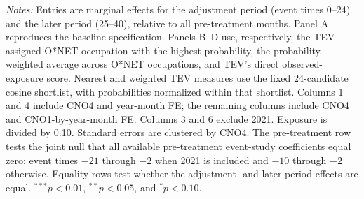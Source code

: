 \begin{table}[H]
\begin{threeparttable}
\begin{minipage}{0.92\textwidth}
\emph{Notes:} Entries are marginal effects for the adjustment period (event times 0--24) and the later period (25--40), relative to all pre-treatment months. Panel A reproduces the baseline specification. Panels B--D use, respectively, the TEV-assigned O*NET occupation with the highest probability, the probability-weighted average across O*NET occupations, and TEV's direct observed-exposure score. Nearest and weighted TEV measures use the fixed 24-candidate cosine shortlist, with probabilities normalized within that shortlist. Columns 1 and 4 include CNO4 and year-month FE; the remaining columns include CNO4 and CNO1-by-year-month FE. Columns 3 and 6 exclude 2021. Exposure is divided by 0.10. Standard errors are clustered by CNO4. The pre-treatment row tests the joint null that all available pre-treatment event-study coefficients equal zero: event times $-21$ through $-2$ when 2021 is included and $-10$ through $-2$ otherwise. Equality rows test whether the adjustment- and later-period effects are equal. $^{***}p<0.01$, $^{**}p<0.05$, and $^{*}p<0.10$.
\end{minipage}
\end{threeparttable}
\end{table}
